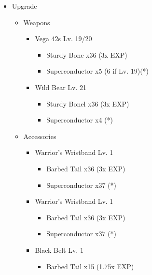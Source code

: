 \begin{paracol}{2}
\begin{upgrade}
	\end{upgrade}
	\switchcolumn
	\begin{upgrade}
		\begin{itemize}
			\item Upgrade
			      \begin{itemize}
				      \item Weapons
				            \begin{itemize}
					            \item Vega 42s Lv. 19/20
					                  \begin{itemize}
						                  \item Sturdy Bone x36 (3x EXP)
						                  \item Superconductor x5 (6 if Lv. 19)(*)
					                  \end{itemize}
					            \item Wild Bear Lv. 21
					                  \begin{itemize}
						                  \item Sturdy Bonel x36 (3x EXP)
						                  \item Superconductor x4 (*)
					                  \end{itemize}
				            \end{itemize}
				      \item Accessories
				            \begin{itemize}
					            \item Warrior's Wristband Lv. 1
					                  \begin{itemize}
						                  \item Barbed Tail x36 (3x EXP)
						                  \item Superconductor x37 (*)
					                  \end{itemize}
					            \item Warrior's Wristband Lv. 1
					                  \begin{itemize}
						                  \item Barbed Tail x36 (3x EXP)
						                  \item Superconductor x37 (*)
					                  \end{itemize}
					            \item Black Belt Lv. 1
					                  \begin{itemize}
						                  \item Barbed Tail x15 (1.75x EXP)

\end{itemize}
\end{itemize}
\end{itemize}
\end{itemize}
\end{upgrade}
\end{paracol}
